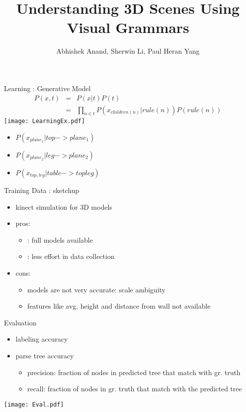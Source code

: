 \documentclass{beamer}
\title{Understanding 3D Scenes Using Visual Grammars}
\author{Abhishek Anand, Sherwin Li, Paul Heran Yang }
\institute{Cornell University}
\begin{document}
\begin{frame}
\titlepage
\end{frame}

\begin{frame}{Learning : Generative Model}
\begin{eqnarray}
P(x,t)&=&P(x|t)P(t) \\
&=& \prod_{n \in t}{P(x_{children(n)} |rule(n) )P(rule(n))}
\end{eqnarray}
               		\texttt{[image: LearningEx.pdf]}
\vskip-1in
		\begin{itemize}
			\item $P(x_{plane_1}| top -> plane_1)$
			\item $P(x_{plane_2}| leg -> plane_2)$
			\item $P(x_{top,leg}| table -> top leg)$
		\end{itemize}


\end{frame}

\begin{frame}{Training Data : sketchup}
\begin{itemize}
\item kinect simulation for 3D models
\item pros:

\begin{itemize}
\item : full models available
\item : less effort in data collection
\end{itemize}
\item cons:
\begin{itemize}
\item models are not very accurate: scale ambiguity
\item features like avg. height and distance from wall not available

\end{itemize}

\end{itemize}

\end{frame}

\begin{frame}{Evaluation}
\begin{itemize}
\item labeling accuracy
\item parse tree accuracy

\begin{itemize}
	\item precision: fraction of nodes in predicted tree that match with gr. truth
	\item recall: fraction of nodes in gr. truth that match with the predicted tree
\end{itemize}
\end{itemize}
               		\texttt{[image: Eval.pdf]}
\end{frame}
\end{document}
